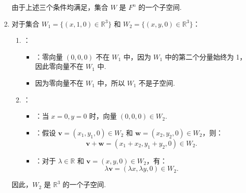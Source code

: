 \begin{exercise}
\begin{exgroup}
\begin{answer}
\begin{enumerate}
                由于上述三个条件均满足，集合 \( W \) 是 \( F^n \) 的一个子空间.

                \item 对于集合 \( W_1 = \{(x, 1, 0) \in \mathbb{R}^3\} \) 和 \( W_2 = \{(x, y, 0) \in \mathbb{R}^3\} \)：

                \begin{enumerate}
                    \item {}：

                    \begin{itemize}
                        \item {}：零向量 \( (0, 0, 0) \) 不在 \( W_1 \) 中，因为 \( W_1 \) 中的第二个分量始终为 1，因此零向量不在 \( W_1 \) 中.
                        \item 因为零向量不在 \( W_1 \) 中，所以 \( W_1 \) 不是子空间.
                    \end{itemize}

                    \item {}：

                    \begin{itemize}
                        \item {}：当 \( x = 0, y = 0 \) 时，向量 \( (0, 0, 0) \in W_2 \).
                        \item {}：假设 \( \mathbf{v} = (x_1, y_1, 0) \in W_2 \) 和 \( \mathbf{w} = (x_2, y_2, 0) \in W_2 \)，则：
                        \[
                        \mathbf{v} + \mathbf{w} = (x_1 + x_2, y_1 + y_2, 0) \in W_2.
                        \]
                        \item {}：对于 \( \lambda \in \mathbb{R} \) 和 \( \mathbf{v} = (x, y, 0) \in W_2 \)，有：
                        \[
                        \lambda \mathbf{v} = (\lambda x, \lambda y, 0) \in W_2.
                        \]
                    \end{itemize}
                \end{enumerate}

                因此，\( W_2 \) 是 \( \mathbb{R}^3 \) 的一个子空间.


\end{enumerate}
\end{answer}
\end{exgroup}
\end{exercise}
